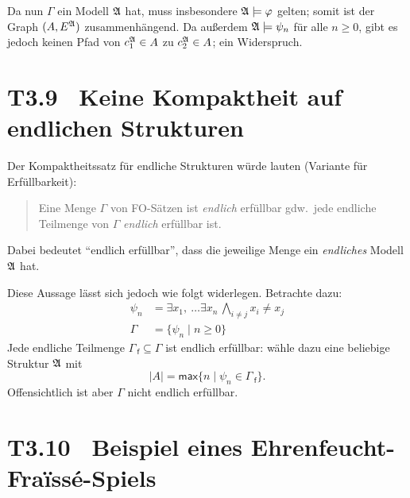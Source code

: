 \documentclass[fontsize=11pt, twoside=false, numbers=autoenddot]{scrbook}
\begin{document}
\begin{beweis}
\begin{description}
\begin{center}
%
      \end{center}
  \end{description}
  \par\medskip
  Da nun $\Gamma$ ein Modell $\mathfrak{A}$ hat, muss insbesondere $\mathfrak{A} \models \varphi$ gelten;
  somit ist der Graph $(A, E^\mathfrak{A})$ zusammenhängend.
  Da außerdem $\mathfrak{A} \models \psi_n$ für alle $n \geq 0$,
  gibt es jedoch keinen Pfad von $c_1^\mathfrak{A} \in A$ zu $c_2^\mathfrak{A} \in A$;
  ein Widerspruch.
  \qedhere
\end{beweis}%

\section*{T3.9~ Keine Kompaktheit auf endlichen Strukturen}

Der Kompaktheitssatz für endliche Strukturen würde lauten (Variante für Erfüllbarkeit):
\begin{quote}
  Eine Menge $\Gamma$ von FO-Sätzen ist \emph{endlich} erfüllbar
  gdw.\ jede endliche Teilmenge von $\Gamma$ \emph{endlich} erfüllbar ist.
\end{quote}
Dabei bedeutet "`endlich erfüllbar"',
dass die jeweilige Menge ein \emph{endliches} Modell $\mathfrak{A}$ hat.

Diese Aussage lässt sich jedoch wie folgt widerlegen.
Betrachte dazu:
%
\begin{align*}
  \psi_n & = \exists x_1,\ \dots \exists x_n\,\bigwedge_{i \neq j} x_i \neq x_j \\
  \Gamma & = \{\psi_n \mid n \geq 0\}
\end{align*}
%
Jede endliche Teilmenge $\Gamma_{\!\!\:\textsf{f}} \subseteq \Gamma$
ist endlich erfüllbar:
wähle dazu eine beliebige Struktur $\mathfrak{A}$ mit
\[
  |A| = \textsf{max}\{n \mid \psi_n \in \Gamma_{\!\!\:\textsf{f}}\}.
\]
Offensichtlich ist aber $\Gamma$ nicht endlich erfüllbar.

\section*{T3.10~ Beispiel eines Ehrenfeucht-Fraïssé-Spiels}
\end{document}
